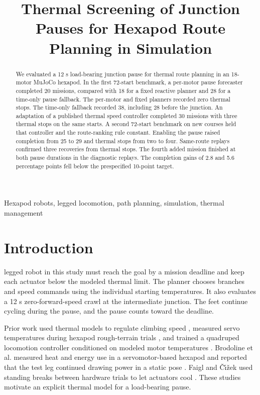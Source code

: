 \documentclass{ieeeaccess}
\begin{document}

\title{Thermal Screening of Junction Pauses for Hexapod Route Planning in Simulation}
\begin{abstract}
We evaluated a 12 s load-bearing junction pause for thermal route planning in an 18-motor MuJoCo hexapod. In the first 72-start benchmark, a per-motor pause forecaster completed 20 missions, compared with 18 for a fixed reactive planner and 28 for a time-only pause fallback. The per-motor and fixed planners recorded zero thermal stops. The time-only fallback recorded 38, including 28 before the junction. An adaptation of a published thermal speed controller completed 30 missions with three thermal stops on the same starts. A second 72-start benchmark on new courses held that controller and the route-ranking rule constant. Enabling the pause raised completion from 25 to 29 and thermal stops from two to four. Same-route replays confirmed three recoveries from thermal stops. The fourth added mission finished at both pause durations in the diagnostic replays. The completion gains of 2.8 and 5.6 percentage points fell below the prespecified 10-point target.
\end{abstract}
\begin{keywords}
Hexapod robots, legged locomotion, path planning, simulation, thermal management
\end{keywords}
\titlepgskip=-21pt
\maketitle

\section{Introduction}

 legged robot in this study must reach the goal by a mission deadline and keep each actuator below the modeled thermal limit. The planner chooses branches and speed commands using the individual starting temperatures. It also evaluates a 12 s zero-forward-speed crawl at the intermediate junction. The feet continue cycling during the pause, and the pause counts toward the deadline.

Prior work used thermal models to regulate climbing speed \cite{trujillo2009}, measured servo temperatures during hexapod rough-terrain trials \cite{faigl2019}, and trained a quadruped locomotion controller conditioned on modeled motor temperatures \cite{wan2026}. Brodoline et al. measured heat and energy use in a servomotor-based hexapod and reported that the test leg continued drawing power in a static pose \cite{brodoline2024}. Faigl and \v{C}\'{\i}\v{z}ek used standing breaks between hardware trials to let actuators cool \cite{faigl2019}. These studies motivate an explicit thermal model for a load-bearing pause.
\end{document}
